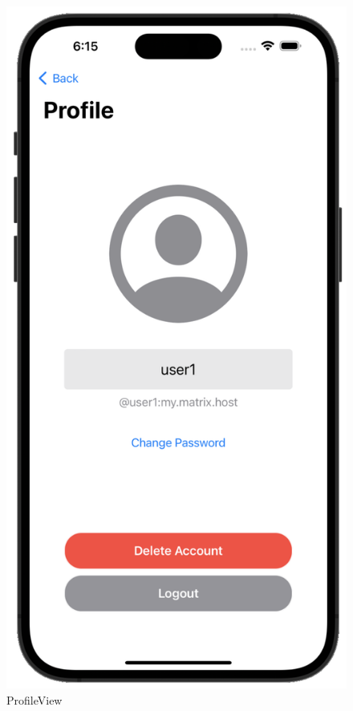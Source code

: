    \begin{figure}[h]
        \includegraphics[scale=0.5]{profile_white}
        \centering
        \caption{ProfileView}\label{fig:profileview}
    \end{figure}


